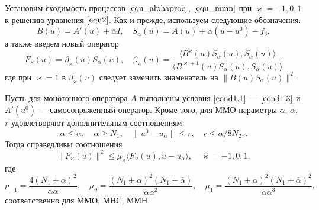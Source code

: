 Установим сходимость процессов $\eqref{equ_alphaproc}$, $\eqref{equ_mmn}$ при $\varkappa=-1,0,1$ к решению уравнения $\eqref{equ2}$. Как и прежде, используем следующие обозначения: 
$$B(u)=A'(u)+\bar\alpha I, \quad S_\alpha (u)=A(u)+\alpha(u-u^0)-f_\delta,
$$
а также введем новый оператор
$$F_\varkappa(u)=\beta_\varkappa(u) S_\alpha(u), \quad \beta _\varkappa(u) =\frac{\langle B^\varkappa(u)S_\alpha(u), S_\alpha (u)\rangle}{\langle B^{\varkappa +1}(u)S_\alpha(u), S_\alpha(u)\rangle}$$ 
где при $\varkappa=1$ в $\beta_\varkappa(u)$ следует заменить знаменатель на $\|B(u)S_\alpha(u)\|^2$.%
\begin{theorem}\label{teo3.1}
	Пусть для монотонного оператора $A$ выполнены условия $\eqref{cond1.1}$ --- $\eqref{cond1.3}$ и $A'(u^0)$ --- самосопряженный оператор. Кроме того, для ММО параметры $\alpha$, $\bar\alpha$, $r$ удовлетворяют дополнительным соотношениям:
	\begin{equation}\label{cond3.3}
	\alpha \le \bar\alpha, \quad \bar\alpha \ge N_1,\quad \|u^0-u_\alpha\|\le r, \quad r\le \alpha/8N_2,.
	\end{equation}
	Тогда справедливы соотношения
	\begin{equation}\label{ineq3.4}
	\|F_\varkappa(u)\|^2 \le \mu_\varkappa\langle F_\varkappa(u), u-u_\alpha\rangle, \quad \varkappa=-1,0,1,
	\end{equation} где
	\begin{equation}\label{cond3.5}
	\mu _{-1}=\frac{4(N_1+\alpha)^2}{\alpha\bar\alpha}, \quad \mu _0= \frac{(N_1+\alpha)^2(N_1+\bar\alpha)}{\alpha{\bar\alpha}^2}, \quad \mu_1= \frac{(N_1+\alpha)^2(N_1+\bar\alpha)^2}{\alpha{\bar\alpha}^3},
	\end{equation}
	соответственно для ММО, МНС, ММН.
\end{theorem}
